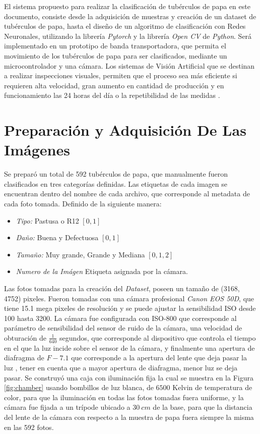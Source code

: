 El sistema propuesto para realizar la clasificación de tubérculos de papa en este documento, consiste desde la adquisición de muestras y creación de un dataset de tubérculos de papa, hasta el diseño de un algoritmo de clasificación con Redes Neuronales, utilizando la librería \textit{Pytorch} y la librería \textit{Open CV} de \textit{Python}. Será implementado en un prototipo de banda transportadora, que permita el movimiento de los tubérculos de papa para ser clasificados, mediante un microcontrolador y una cámara. Los sistemas de Visión Artificial que se destinan a realizar inspecciones visuales, permiten que el proceso sea más eficiente si requieren alta velocidad, gran aumento en cantidad de producción y en funcionamiento las 24 horas del día o la repetibilidad de las medidas \cite{artificial2012aplicacion}.


\section{Preparación y Adquisición De Las Imágenes}

Se preparó un total de 592 tubérculos de papa, que manualmente fueron clasificados en tres categorías definidas. Las etiquetas de cada imagen se encuentran dentro del nombre de cada archivo, que corresponde al metadata de cada foto tomada. Definido de la siguiente manera:

\begin{itemize}
	\item \textit{Tipo:} Pastusa o R12 $[0,1]$
	\item \textit{Daño:} Buena y Defectuosa $[0,1]$
	\item \textit{Tamaño:} Muy grande, Grande y Mediana $[0,1,2]$
	\item \textit{Numero de la Imágen} Etiqueta asignada por la cámara.
\end{itemize}	

Las fotos tomadas para la creación del \textit{Dataset}, poseen un tamaño de (3168, 4752) pixeles. Fueron tomadas con una cámara profesional \textit{Canon EOS 50D}, que tiene 15.1 mega pixeles de resolución y se puede ajustar la sensibilidad ISO desde 100 hasta 3200. La cámara fue configurada con ISO-800 que corresponde al parámetro de sensibilidad del sensor de ruido de la cámara, una velocidad de obturación de $\frac{1}{640}$ segundos, que corresponde al dispositivo que controla el tiempo en el que la luz incide sobre el sensor de la cámara, y finalmente una apertura de diafragma de $F-7.1$ que corresponde a la apertura del lente que deja pasar la luz \cite{Camara}, tener en cuenta que a mayor apertura de diafragma, menor luz se deja pasar. Se construyó una caja con iluminación fija la cual se muestra en la Figura \ref{fig:chamber} usando bombillos de luz blanca, de $6500$ Kelvin de temperatura de color, para que la iluminación en todas las fotos tomadas fuera uniforme, y la cámara fue fijada a un trípode ubicado a $30 \ cm$ de la base, para que la distancia del lente de la cámara con respecto a la muestra de papa fuera siempre la misma en las 592 fotos.

